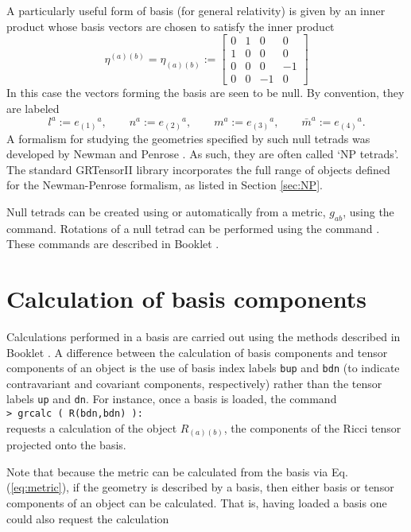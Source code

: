 \documentclass{article}
\begin{document}
A particularly useful form of basis (for general relativity) is given
by an inner product whose basis vectors are chosen to satisfy the inner
product
\[
  \eta^{(a)(b)} = \eta_{(a)(b)} :=
    \left[
      \begin{array}{cccc}
        0 & 1 & 0 & 0 \\
        1 & 0 & 0 & 0 \\
        0 & 0 & 0 &-1 \\
        0 & 0 &-1 & 0
      \end{array}
    \right]
\]
In this case the vectors forming the basis are seen to be null. By
convention, they are labeled
\[
  l^a := e_{(1)}{}^a, \qquad n^a := e_{(2)}{}^a, \qquad
  m^a := e_{(3)}{}^a, \qquad \bar{m}^a := e_{(4)}{}^a.
\]
A formalism for studying the geometries specified by such null tetrads
was developed by Newman and Penrose \cite{newman/penrose:1962}. As such,
they are often called `NP tetrads'. The standard GRTensorII library
incorporates the full range of objects defined for the Newman-Penrose
formalism, as listed in Section \ref{sec:NP}.

Null tetrads can be created using  or automatically from
a metric, $g_{ab}$, using the  command. Rotations of
a null tetrad can be performed using the command .
These commands are described in Booklet \grMakegRef.
%
\section{Calculation of basis components}
%
Calculations performed in a basis are carried out using the methods
described in Booklet \grCalcRef. A difference between the
calculation of basis components and tensor components of an object is
the use of basis index labels \texttt{bup} and \texttt{bdn} (to
indicate contravariant and covariant components, respectively) rather
than the tensor labels \texttt{up} and \texttt{dn}. For instance,
once a basis is loaded, the command\\

\noindent\texttt{> grcalc ( R(bdn,bdn) ):}\\

\noindent requests a calculation of the object $R_{(a)(b)}$, the
components of the Ricci tensor projected onto the basis.

Note that because the metric can be calculated from the basis via
Eq. (\ref{eq:metric}), if the geometry is described by a basis, then
either basis or tensor components of an object can be calculated. That
is, having loaded a basis one could also request the calculation\\
\end{document}
